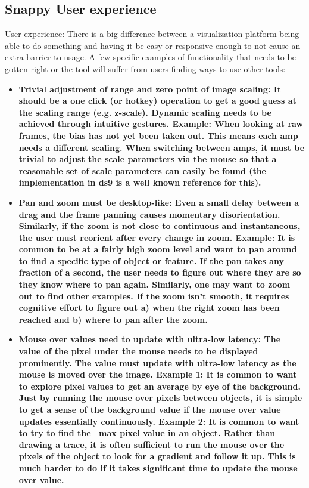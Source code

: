\subsection{Snappy User experience}
User experience:
There is a big difference between a visualization platform being able to do something and having it be easy or responsive enough to not cause an extra barrier to usage.  A few specific examples of functionality that needs to be gotten right or the tool will suffer from users finding ways to use other tools:
\begin{itemize}

\item{\bf{Trivial adjustment of range and zero point of image scaling}:
It should be a one click (or hotkey) operation to get a good guess at the scaling range (e.g. z-scale).
Dynamic scaling needs to be achieved through intuitive gestures.
Example: When looking at raw frames, the bias has not yet been taken out.  This means each amp needs a different scaling.  When switching between amps, it must be trivial to adjust the scale parameters via the mouse so that a reasonable set of scale parameters can easily be found (the implementation in ds9 is a well known reference for this).}
\item{\bf{Pan and zoom must be desktop-like}:
Even a small delay between a drag and the frame panning causes momentary disorientation.
Similarly, if the zoom is not close to continuous and instantaneous, the user must reorient after every change in zoom.
Example: It is common to be at a fairly high zoom level and want to pan around to find a specific type of object or feature.  If the pan takes any fraction of a second, the user needs to figure out where they are so they know where to pan again.  Similarly, one may want to zoom out to find other examples.  If the zoom isn't smooth, it requires cognitive effort to figure out a) when the right zoom has been reached and b) where to pan after the zoom.}
\item{\bf{Mouse over values need to update with ultra-low latency}:
The value of the pixel under the mouse needs to be displayed prominently.
The value must update with ultra-low latency as the mouse is moved over the image.
Example 1: It is common to want to explore pixel values to get an average by eye of the background.  Just by running the mouse over pixels between objects, it is simple to get a sense of the background value if the mouse over value updates essentially continuously.
Example 2: It is common to want to try to find the ~max pixel value in an object.  Rather than drawing a trace, it is often sufficient to run the mouse over the pixels of the object to look for a gradient and follow it up.  This is much harder to do if it takes significant time to update the mouse over value.}

\end{itemize}
